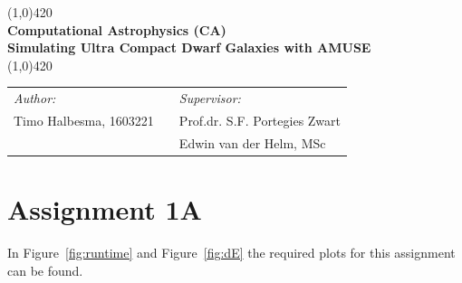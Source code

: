 \documentclass[a4paper]{article}
\begin{document}
\begin{center}
\line(1,0){420} \\
\huge \textbf{Computational Astrophysics (CA) \\
Simulating Ultra Compact Dwarf Galaxies with AMUSE} \\
\line(1,0){420}
\end{center}

\vfill



\begin{table}[h]
\begin{center}
\begin{tabular}{lp{5cm}l}
\textit{Author:} & & \emph{Supervisor:} \\
Timo Halbesma, 1603221 & & Prof.dr. S.F. Portegies Zwart\\
& & Edwin van der Helm, MSc\\
\end{tabular}
\end{center}
\end{table}


\newpage







\section*{Assignment 1A}
In Figure~\ref{fig:runtime} and Figure~\ref{fig:dE} the required plots for this
assignment can be found. \\
\end{document}
